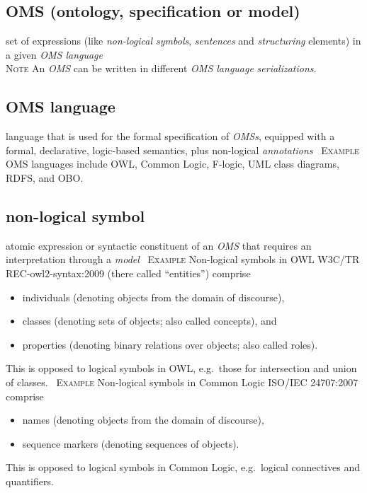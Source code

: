 \documentclass[10pt,%
\ifpretendfinal
final%
\else
draft%
\fi,
]{scrreprt}
\newcommand*{\termref}[1]{\textit{#1}}
\newcommand{\termdefinition}[2]{\subsection*{#1}#2}
\newcommand{\nisref}[1]{#1}
\newenvironment{definitions}[0]{\medskip }{}
\newenvironment{note}[0]{\ \\ \textsc{Note} \quad}{}
\newenvironment{example}[0]{\ \newline \textsc{Example}\quad }{}
\begin{document}
\begin{definitions}

  \termdefinition{OMS (ontology, specification or model)}{set of expressions (like \termref{non-logical symbols}, \termref{sentences} and \termref{structuring} elements) in a  given \termref{OMS language}}%
\begin{note}
	An \termref{OMS} can be written in different \termref{OMS language} \termref{serializations}.
\end{note}	

  \termdefinition{OMS language}{language that is used for the formal specification of \termref{OMSs}, equipped with a formal, declarative, logic-based semantics, plus non-logical \termref{annotations}}
  \begin{example}
    OMS languages include OWL, Common Logic, F-logic, UML class diagrams, RDFS, and OBO.
  \end{example}
  
  \termdefinition{non-logical symbol}{atomic expression or syntactic constituent of an \termref{OMS} that requires an interpretation through a \termref{model}}
  \begin{example}
    Non-logical symbols in OWL \nisref{W3C/TR REC-owl2-syntax:2009} (there called ``entities'') comprise
    \begin{itemize}
    \item individuals (denoting objects from the domain of discourse),
    \item classes (denoting sets of objects; also called concepts), and
    \item properties (denoting binary relations over objects; also called
      roles).
    \end{itemize}
    This is opposed to logical symbols in OWL, e.g.\ those for intersection
    and union of classes.
  \end{example}
  \begin{example}
    Non-logical symbols in Common Logic \nisref{ISO/IEC 24707:2007} comprise
    \begin{itemize}
    \item names (denoting objects from the domain of discourse),
    \item sequence markers (denoting sequences of objects).
    \end{itemize}
    This is opposed to logical symbols in Common Logic, e.g.\ logical connectives and
    quantifiers.
  \end{example}
  

\end{definitions}
\end{document}
